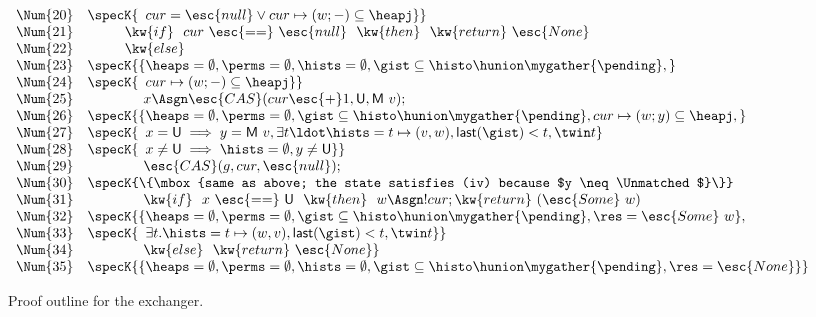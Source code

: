 {\begin{figure}
\[{{\begin{array}{rl}
\Num{20} & \specK{\hphantom{\}}cur = \esc{null} \vee cur \mapsto (w; -) \subseteq \heapj\}}\\
\Num{21} & ~~~~ ~~~~ \kw{if}~~cur~\esc{==}~\esc{null}~~\kw{then}~~\kw{return}~{\esc{None}}\\
\Num{22} & ~~~~ ~~~~ \kw{else}\\
\Num{23} & \specK{\{\heaps = \emptyset, \perms = \emptyset, \hists = \emptyset, \gist \subseteq \histo \hunion \mygather{\pending},}\\
\Num{24} & \specK{\hphantom{\}} cur \mapsto (w; -) \subseteq \heapj\}}\\
\Num{25} & ~~~~ ~~~~ ~~~~ x \Asgn \esc{CAS}(cur\esc{+}1, \Unmatched, \Matched v);\\
\Num{26} & \specK{\{\heaps = \emptyset, \perms = \emptyset, \gist \subseteq \histo \hunion \mygather{\pending}, cur \mapsto (w; y) \subseteq \heapj,} \\
\Num{27} & \specK{\hphantom{\}}x = \Unmatched \implies y = \Matched v, \exists t\ldot \hists = t \mapsto (v, w), \mathsf{last}(\gist) < t, \twin t}\\
\Num{28} & \specK{\hphantom{\}}x \neq \Unmatched \implies \hists = \emptyset, y \neq \Unmatched \}}\\
\Num{29} & ~~~~ ~~~~ ~~~~ \esc{CAS}(g, cur, \esc{null});\\
\Num{30} & \specK{\{\mbox{same as above; the state satisfies (iv) because $y \neq \Unmatched$}\}}\\
\Num{31} & ~~~~ ~~~~ ~~~~ \kw{if}~~x~\esc{==}~\Unmatched~~\kw{then}~~w\Asgn !cur;\kw{return}~(\esc{Some}\ w)\\
\Num{32} & \specK{\{ \heaps = \emptyset, \perms = \emptyset, \gist \subseteq \histo \hunion \mygather{\pending}, \res=\esc{Some}\ w}, \\
\Num{33} & \specK{\hphantom{\}}\exists t. \hists = t \mapsto (w, v), \mathsf{last}(\gist) < t, \twin t\}}\\
\Num{34} & ~~~~ ~~~~ ~~~~ \kw{else}~~\kw{return}~\esc{None}\}\\
\Num{35} & \specK{\{\heaps = \emptyset, \perms = \emptyset, \hists = \emptyset, \gist \subseteq \histo \hunion \mygather{\pending}, \res=\esc{None}\}} 
\end{array}
}}
\]
\caption{Proof outline for the exchanger.}
\label{fig:exchanger_proof}
\end{figure} 
}

